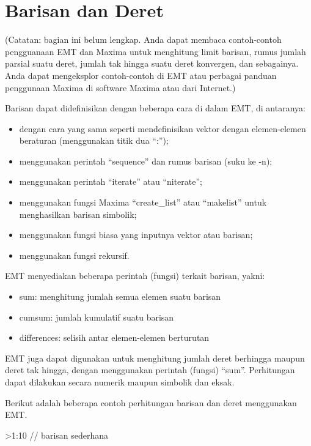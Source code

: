 \documentclass[
]{book}
\providecommand{\tightlist}{%
  \setlength{\itemsep}{0pt}\setlength{\parskip}{0pt}}
\begin{document}
\chapter{Barisan dan Deret}\label{barisan-dan-deret}

(Catatan: bagian ini belum lengkap. Anda dapat membaca contoh-contoh pengguanaan EMT dan Maxima untuk menghitung limit barisan, rumus jumlah parsial suatu deret, jumlah tak hingga suatu deret konvergen, dan sebagainya. Anda dapat mengeksplor contoh-contoh di EMT atau perbagai panduan penggunaan Maxima di software Maxima atau dari Internet.)

Barisan dapat didefinisikan dengan beberapa cara di dalam EMT, di antaranya:

\begin{itemize}
\tightlist
\item
  dengan cara yang sama seperti mendefinisikan vektor dengan elemen-elemen beraturan (menggunakan titik dua ``:'');
\item
  menggunakan perintah ``sequence'' dan rumus barisan (suku ke -n);
\item
  menggunakan perintah ``iterate'' atau ``niterate'';
\item
  menggunakan fungsi Maxima ``create\_list'' atau ``makelist'' untuk menghasilkan barisan simbolik;
\item
  menggunakan fungsi biasa yang inputnya vektor atau barisan;
\item
  menggunakan fungsi rekursif.
\end{itemize}

EMT menyediakan beberapa perintah (fungsi) terkait barisan, yakni:

\begin{itemize}
\tightlist
\item
  sum: menghitung jumlah semua elemen suatu barisan
\item
  cumsum: jumlah kumulatif suatu barisan
\item
  differences: selisih antar elemen-elemen berturutan
\end{itemize}

EMT juga dapat digunakan untuk menghitung jumlah deret berhingga maupun deret tak hingga, dengan menggunakan perintah (fungsi) ``sum''. Perhitungan dapat dilakukan secara numerik maupun simbolik dan eksak.

Berikut adalah beberapa contoh perhitungan barisan dan deret menggunakan EMT.

\textgreater1:10 // barisan sederhana
\end{document}
